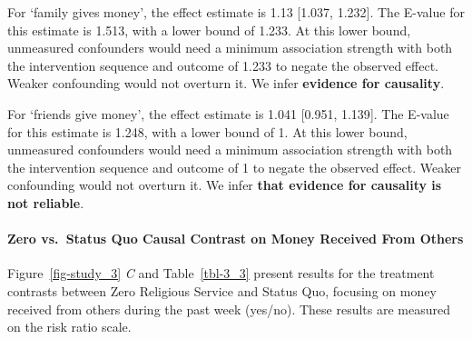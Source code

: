 \documentclass[
  single column]{article}
\let\oldparagraph\paragraph
\renewcommand{\paragraph}[1]{\oldparagraph{#1}\mbox{}}
\begin{document}
For `family gives money', the effect estimate is 1.13 {[}1.037,
1.232{]}. The E-value for this estimate is 1.513, with a lower bound of
1.233. At this lower bound, unmeasured confounders would need a minimum
association strength with both the intervention sequence and outcome of
1.233 to negate the observed effect. Weaker confounding would not
overturn it. We infer \textbf{evidence for causality}.

For `friends give money', the effect estimate is 1.041 {[}0.951,
1.139{]}. The E-value for this estimate is 1.248, with a lower bound of
1. At this lower bound, unmeasured confounders would need a minimum
association strength with both the intervention sequence and outcome of
1 to negate the observed effect. Weaker confounding would not overturn
it. We infer \textbf{that evidence for causality is not reliable}.

\paragraph{Zero vs.~Status Quo Causal Contrast on Money Received From
Others}\label{zero-vs.-status-quo-causal-contrast-on-money-received-from-others}

Figure~\ref{fig-study_3} \emph{C} and Table~\ref{tbl-3_3} present
results for the treatment contrasts between Zero Religious Service and
Status Quo, focusing on money received from others during the past week
(yes/no). These results are measured on the risk ratio scale.
\end{document}

